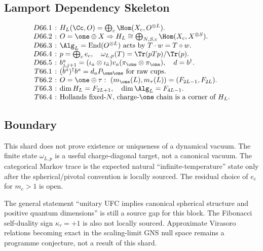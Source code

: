 \subsection{Lamport Dependency Skeleton}

{\small
\[
\setlength{\arraycolsep}{2pt}
\begin{array}{rcl}
D66.1&:& H_L(\Cc,O)=\bigoplus_c\Hom(X_c,O^{\otimes L}).\\
D66.2&:& O=\one\oplus X\Rightarrow
         H_L\cong\bigoplus_{N,S,c}\Hom(X_c,X^{\otimes S}).\\
D66.3&:& \Alg_L=\operatorname{End}(O^{\otimes L})\text{ acts by }T\cdot w=T\circ w.\\
D66.4&:& p=\bigoplus_c e_c,\quad
         \omega_{L,p}(T)=\Tr(pTp)/\Tr(p).\\
D66.5&:& b^a_{j,j+1}=(\iota_a\otimes\iota_{\bar a})v_a
         (\pi_{\one}\otimes\pi_{\one}),\quad d=b^\dagger.\\
T66.1&:& (b^a)^\dagger b^a=d_aP_{\one\one}\text{ for raw cups}.\\
T66.2&:& O=\one\oplus\tau:\ (m_{\one}(L),m_\tau(L))=(F_{2L-1},F_{2L}).\\
T66.3&:& \dim H_L=F_{2L+1},\quad \dim\Alg_L=F_{4L-1}.\\
T66.4&:& \text{Hollands fixed-}N\text{, charge-}\one\text{ chain is a corner of }H_L.
\end{array}
\]
}

\subsection{Boundary}

This shard does not prove existence or uniqueness of a dynamical vacuum.  The
finite state \(\omega_{L,p}\) is a useful charge-diagonal target, not a canonical
vacuum.  The categorical Markov trace is the expected natural
``infinite-temperature'' state only after the spherical/pivotal convention is
locally sourced.  The residual choice of \(e_c\) for \(m_c>1\) is open.

The general statement ``unitary UFC implies canonical spherical structure and
positive quantum dimensions'' is still a source gap for this block.  The
Fibonacci self-duality sign \(\kappa_\tau=+1\) is also not locally sourced.
Approximate Virasoro relations becoming exact in the scaling-limit GNS null
space remains a programme conjecture, not a result of this shard.
